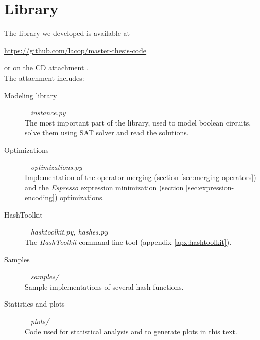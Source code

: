 \chapter{Library}

The library  we developed is available at
\begin{center}
\url{https://github.com/lacop/master-thesis-code}
\end{center}
or on the CD attachment \citep{papay2016code}.
~\\

\noindent The attachment includes:
\begin{description}
\item[Modeling library] ~ \emph{instance.py} \\
The most important part of the library, used to model boolean circuits, solve them using SAT solver and read the solutions.

\item[Optimizations] ~ \emph{optimizations.py} \\
Implementation of the operator merging (section \ref{sec:merging-operators}) and the \emph{Espresso} expression minimization (section \ref{sec:expression-encoding}) optimizations.

\item[HashToolkit] ~ \emph{hashtoolkit.py, hashes.py} \\
The \emph{HashToolkit} command line tool (appendix \ref{apx:hashtoolkit}).

\item[Samples] ~ \emph{samples/} \\
Sample implementations of several hash functions.

\item[Statistics and plots] ~ \emph{plots/} \\
Code used for statistical analysis and to generate plots in this text.
\end{description}